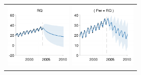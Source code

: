 \documentclass[twoside]{article}
\begin{document}
\begin{figure}
\centering
\newcommand{\wmg}{0.39\columnwidth}  %
\newcommand{\hmg}{3.2cm}  %
\begin{tabular}{c}
\hspace{-0.7cm} \includegraphics[width=\wmg,height=\hmg]{../figures/decomposition/11-Feb-v4-03-mauna2003-s_max_level_0/03-mauna2003-s_all_small} 
\hspace{-0.7cm} \includegraphics[width=\wmg,height=\hmg]{../figures/decomposition/11-Feb-v4-03-mauna2003-s_max_level_1/03-mauna2003-s_all_small}

\end{tabular}
\end{figure}
\end{document}
